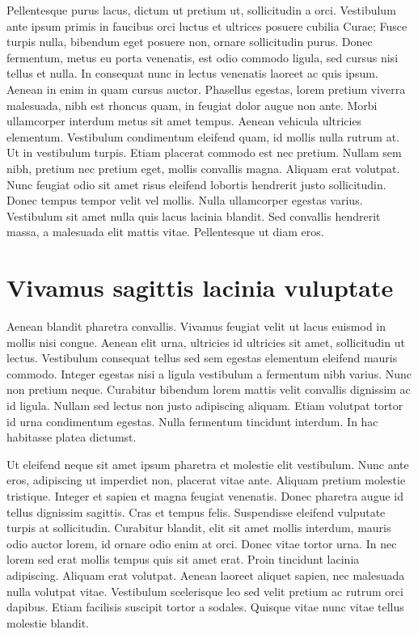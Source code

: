 Pellentesque purus lacus, dictum ut pretium ut, sollicitudin a orci. Vestibulum ante ipsum primis in faucibus orci luctus et ultrices posuere cubilia Curae; Fusce turpis nulla, bibendum eget posuere non, ornare sollicitudin purus. Donec fermentum, metus eu porta venenatis, est odio commodo ligula, sed cursus nisi tellus et nulla. In consequat nunc in lectus venenatis laoreet ac quis ipsum. Aenean in enim in quam cursus auctor. Phasellus egestas, lorem pretium viverra malesuada, nibh est rhoncus quam, in feugiat dolor augue non ante. Morbi ullamcorper interdum metus sit amet tempus. Aenean vehicula ultricies elementum. Vestibulum condimentum eleifend quam, id mollis nulla rutrum at. Ut in vestibulum turpis. Etiam placerat commodo est nec pretium. Nullam sem nibh, pretium nec pretium eget, mollis convallis magna. Aliquam erat volutpat. Nunc feugiat odio sit amet risus eleifend lobortis hendrerit justo sollicitudin. Donec tempus tempor velit vel mollis. Nulla ullamcorper egestas varius. Vestibulum sit amet nulla quis lacus lacinia blandit. Sed convallis hendrerit massa, a malesuada elit mattis vitae. Pellentesque ut diam eros.


\section{Vivamus sagittis lacinia vuluptate}

Aenean blandit pharetra convallis. Vivamus feugiat velit ut lacus euismod in mollis nisi congue. Aenean elit urna, ultricies id ultricies sit amet, sollicitudin ut lectus. Vestibulum consequat tellus sed sem egestas elementum eleifend mauris commodo. Integer egestas nisi a ligula vestibulum a fermentum nibh varius. Nunc non pretium neque. Curabitur bibendum lorem mattis velit convallis dignissim ac id ligula. Nullam sed lectus non justo adipiscing aliquam. Etiam volutpat tortor id urna condimentum egestas. Nulla fermentum tincidunt interdum. In hac habitasse platea dictumst.

Ut eleifend neque sit amet ipsum pharetra et molestie elit vestibulum. Nunc ante eros, adipiscing ut imperdiet non, placerat vitae ante. Aliquam pretium molestie tristique. Integer et sapien et magna feugiat venenatis. Donec pharetra augue id tellus dignissim sagittis. Cras et tempus felis. Suspendisse eleifend vulputate turpis at sollicitudin. Curabitur blandit, elit sit amet mollis interdum, mauris odio auctor lorem, id ornare odio enim at orci. Donec vitae tortor urna. In nec lorem sed erat mollis tempus quis sit amet erat. Proin tincidunt lacinia adipiscing. Aliquam erat volutpat. Aenean laoreet aliquet sapien, nec malesuada nulla volutpat vitae. Vestibulum scelerisque leo sed velit pretium ac rutrum orci dapibus. Etiam facilisis suscipit tortor a sodales. Quisque vitae nunc vitae tellus molestie blandit.

